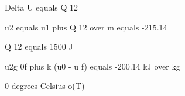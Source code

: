 Delta U equals Q 12

u2 equals u1 plus Q 12 over m equals -215.14

Q 12 equals 1500 J

u2g 0f plus k (u0 - u f) equals -200.14 kJ over kg

0 degrees Celsius o(T)